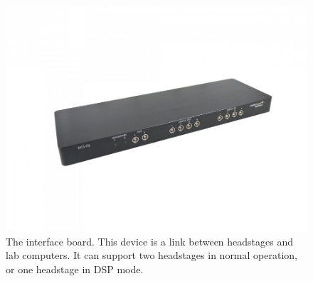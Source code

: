 \begin{figure}[h!]
    \includegraphics[width=\linewidth]{images/MCS-IFB.jpg}
    \caption{The interface board.
      This device is a link between headstages and lab computers.
    It can support two headstages in normal operation, or one headstage in DSP mode.}
    \label{fig:neuron_anatomy}
\end{figure}
